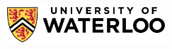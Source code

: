 \begin{titlepage}
    \begin{addmargin}[-1cm]{-3cm}
        \begin{center}
            \large

            \hfill

            \vfill

            {
                \color{CTtitle}\spacedallcaps{\myTitle} \\ \bigskip
            }

            \spacedlowsmallcaps{\myName}

            \vfill

            \includegraphics[width=6cm]{img/uwlogo} \\ \medskip

            \myDegree \\
            \myDepartment \\
            \myFaculty \\
            \myInst \\
            \myUni \\ \bigskip

            \myTime

            \vfill

        \end{center}
    \end{addmargin}
\end{titlepage}

